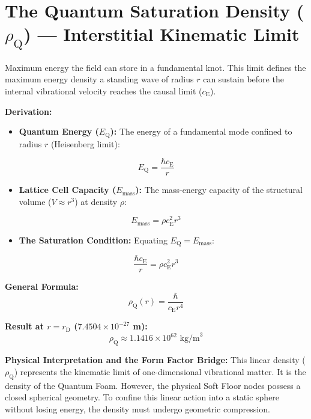 \section{The Quantum Saturation Density ($\rho_{\mathrm{Q}}$) --- Interstitial Kinematic Limit}
Maximum energy the field can store in a fundamental knot. This limit defines the maximum energy density a standing wave of radius $r$ can sustain before the internal vibrational velocity reaches the causal limit ($c_{\mathrm{E}}$).

\noindent\textbf{Derivation:}
\begin{itemize}
    \item \textbf{Quantum Energy ($E_{\mathrm{Q}}$):} The energy of a fundamental mode confined to radius $r$ (Heisenberg limit):
\end{itemize}
\begin{equation}
    E_{\mathrm{Q}} = \frac{\hbar c_{\mathrm{E}}}{r}
\end{equation}

\begin{itemize}
    \item \textbf{Lattice Cell Capacity ($E_{\mathrm{mass}}$):} The mass-energy capacity of the structural volume ($V \approx r^3$) at density $\rho$:
\end{itemize}
\begin{equation}
    E_{\mathrm{mass}} = \rho c_{\mathrm{E}}^2 r^3
\end{equation}

\begin{itemize}
    \item \textbf{The Saturation Condition:} Equating $E_{\mathrm{Q}} = E_{\mathrm{mass}}$:
\end{itemize}
\begin{equation}
    \frac{\hbar c_{\mathrm{E}}}{r} = \rho c_{\mathrm{E}}^2 r^3
\end{equation}

\noindent\textbf{General Formula:}
\begin{equation}
    \rho_{\mathrm{Q}}(r) = \frac{\hbar}{c_{\mathrm{E}} r^4}
\end{equation}

\noindent\textbf{Result at $r = r_{\mathrm{D}}$ ($7.4504 \times 10^{-27}$ m):}
\begin{equation}
    \rho_{\mathrm{Q}} \approx 1.1416 \times 10^{62} \text{ kg/m}^3
\end{equation}

\noindent\textbf{Physical Interpretation and the Form Factor Bridge:}
This linear density ($\rho_{\mathrm{Q}}$) represents the kinematic limit of one-dimensional vibrational matter. It is the density of the Quantum Foam. However, the physical Soft Floor nodes possess a closed spherical geometry. To confine this linear action into a static sphere without losing energy, the density must undergo geometric compression.


